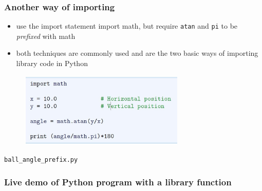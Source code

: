 \documentclass[14pt]{beamer}
\newcommand\red[1]{{\color{red} #1}}
\begin{document}

\begin{frame}[fragile]
\frametitle{Another way of importing}

\begin{itemize}
	\item use the import statement import math, but require \texttt{atan} and \texttt{pi} to be \red{\emph{prefixed}} with math
	\item both techniques are commonly used and are the two basic ways of importing library code in Python
\end{itemize}
\begin{figure}[ht]
	\centering
	\includegraphics[width=0.7\textwidth]{figures/LLp14}
\end{figure}
\vspace*{-5mm}
\begin{center}
	\texttt{ball\_angle\_prefix.py}
\end{center}

\end{frame}


\begin{frame}[fragile]
\frametitle{Live demo of Python program with a library function}

\end{frame}

\end{document}
